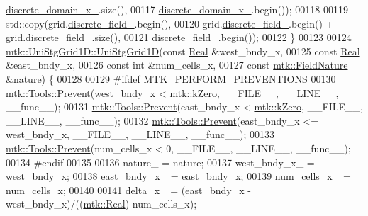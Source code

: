\begin{DoxyCode}
      \hyperlink{classmtk_1_1UniStgGrid1D_a0a1f9c00e21659e05f414dd97e2a52e3}{discrete\_domain\_x\_}.size(),
00117               \hyperlink{classmtk_1_1UniStgGrid1D_a0a1f9c00e21659e05f414dd97e2a52e3}{discrete\_domain\_x\_}.begin());
00118 
00119     std::copy(grid.\hyperlink{classmtk_1_1UniStgGrid1D_a7379a5c6d16210cdd61ffa731bc47edc}{discrete\_field\_}.begin(),
00120               grid.\hyperlink{classmtk_1_1UniStgGrid1D_a7379a5c6d16210cdd61ffa731bc47edc}{discrete\_field\_}.begin() + grid.\hyperlink{classmtk_1_1UniStgGrid1D_a7379a5c6d16210cdd61ffa731bc47edc}{discrete\_field\_}.size(),
00121               \hyperlink{classmtk_1_1UniStgGrid1D_a7379a5c6d16210cdd61ffa731bc47edc}{discrete\_field\_}.begin());
00122 \}
00123 
\hypertarget{mtk__uni__stg__grid__1d_8cc_source_l00124}{}\hyperlink{classmtk_1_1UniStgGrid1D_ae19250f0cddef7a05c4a73a90991a26a}{00124} \hyperlink{classmtk_1_1UniStgGrid1D_ab0c1bb8afad2420fdb4434eb21bdec82}{mtk::UniStgGrid1D::UniStgGrid1D}(\textcolor{keyword}{const} \hyperlink{group__c01-roots_gac080bbbf5cbb5502c9f00405f894857d}{Real} &west\_bndy\_x,
00125                                 \textcolor{keyword}{const} \hyperlink{group__c01-roots_gac080bbbf5cbb5502c9f00405f894857d}{Real} &east\_bndy\_x,
00126                                 \textcolor{keyword}{const} \textcolor{keywordtype}{int} &num\_cells\_x,
00127                                 \textcolor{keyword}{const} \hyperlink{group__c02-enums_ga4c54f2a329cfb4e56213b02a259d19e2}{mtk::FieldNature} &nature) \{
00128 
00129 \textcolor{preprocessor}{  #ifdef MTK\_PERFORM\_PREVENTIONS}
00130   \hyperlink{classmtk_1_1Tools_a332324c6f25e66be9dff48c5987a3b9f}{mtk::Tools::Prevent}(west\_bndy\_x < \hyperlink{group__c01-roots_ga59a451a5fae30d59649bcda274fea271}{mtk::kZero}, \_\_FILE\_\_, \_\_LINE\_\_, \_\_func\_\_);
00131   \hyperlink{classmtk_1_1Tools_a332324c6f25e66be9dff48c5987a3b9f}{mtk::Tools::Prevent}(east\_bndy\_x < \hyperlink{group__c01-roots_ga59a451a5fae30d59649bcda274fea271}{mtk::kZero}, \_\_FILE\_\_, \_\_LINE\_\_, \_\_func\_\_);
00132   \hyperlink{classmtk_1_1Tools_a332324c6f25e66be9dff48c5987a3b9f}{mtk::Tools::Prevent}(east\_bndy\_x <= west\_bndy\_x, \_\_FILE\_\_, \_\_LINE\_\_, \_\_func\_\_);
00133   \hyperlink{classmtk_1_1Tools_a332324c6f25e66be9dff48c5987a3b9f}{mtk::Tools::Prevent}(num\_cells\_x < 0, \_\_FILE\_\_, \_\_LINE\_\_, \_\_func\_\_);
00134 \textcolor{preprocessor}{  #endif}
00135 
00136   nature\_ = nature;
00137   west\_bndy\_x\_ = west\_bndy\_x;
00138   east\_bndy\_x\_ = east\_bndy\_x;
00139   num\_cells\_x\_ = num\_cells\_x;
00140 
00141   delta\_x\_ = (east\_bndy\_x - west\_bndy\_x)/((\hyperlink{group__c01-roots_gac080bbbf5cbb5502c9f00405f894857d}{mtk::Real}) num\_cells\_x);

\end{DoxyCode}
